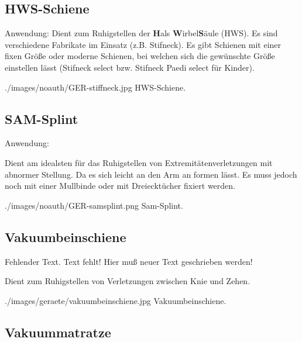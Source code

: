 \subsection{HWS-Schiene}
\label{topic:hws-schiene-beschreibung}

Anwendung: 
{
Dient zum Ruhigstellen der {\bfseries H}als{\bfseries
W}irbel{\bfseries S}äule (HWS). Es sind verschiedene
Fabrikate im Einsatz (z.B. Stifneck\texttrademark). Es gibt
Schienen mit einer fixen Größe oder moderne Schienen, bei
welchen sich die gewünschte Größe einstellen lässt
(Stifneck select{\texttrademark} bzw. Stifneck Paedi
select{\texttrademark} für Kinder).
}{

}
{./images/noauth/GER-stiffneck.jpg}
{HWS-Schiene.}
{}




\subsection{SAM-Splint}

\label{topic:sam-splint-beschreibung}

Anwendung: 

{
Dient am idealsten für das Ruhigstellen von Extremitätenverletzungen mit
abnormer Stellung. Da es sich leicht an den Arm an formen lässt. Es muss jedoch
noch mit einer Mullbinde oder mit Dreiecktücher fixiert werden. 
}{

}
{./images/noauth/GER-samsplint.png}
{Sam-Splint.}
{}


\subsection{Vakuumbeinschiene}
\label{topic:vacuumbeinschiene-beschreibung}

{
\begin{anfxerror}[author=GABS]{Fehlender Text.}
  Text fehlt! Hier muß neuer Text geschrieben werden!
\end{anfxerror}
Dient zum Ruhigstellen von Verletzungen zwischen Knie und Zehen.
}{

}
{./images/geraete/vakuumbeinschiene.jpg}
{\AuthNotesPicLegalOk{}{}Vakuumbeinschiene.}
{}





\subsection{Vakuummatratze}
\label{topic:vakuummatratze-beschreibung}

